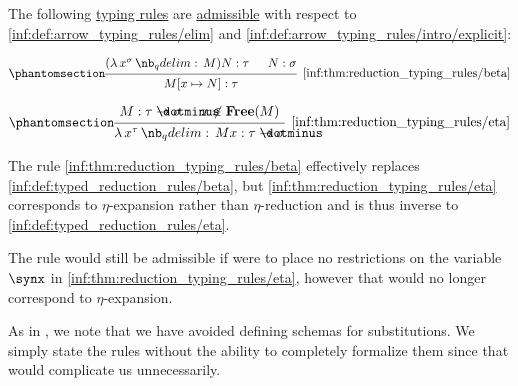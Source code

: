 \begin{proposition}\label{thm:reduction_typing_rules}
  The following \hyperref[con:typing_rule]{typing rules} are \hyperref[con:inference_rule_admissibility]{admissible} with respect to \ref{inf:def:arrow_typing_rules/elim} and \ref{inf:def:arrow_typing_rules/intro/explicit}:
  \begin{paracol}{2}
    \begin{leftcolumn}
      \ParacolAlignmentHack
      \begin{equation*}\taglabel[\ensuremath{ \rightarrow_\beta }]{inf:thm:reduction_typing_rules/beta}
        \begin{prooftree}
          \hypo{ (\qabs {x^{\sigma}} M) N: \tau }
          \hypo{ N: \sigma }
          \infer2[\ref{inf:thm:reduction_typing_rules/beta}]{ M[x \mapsto N]: \tau }.
        \end{prooftree}
      \end{equation*}
    \end{leftcolumn}

    \begin{rightcolumn}
      \ParacolAlignmentHack
      \begin{equation*}\taglabel[\ensuremath{ \leftarrow_\eta }]{inf:thm:reduction_typing_rules/eta}
        \begin{prooftree}
          \hypo{ M: \tau \synimplies \sigma }
          \hypo{ x \not\in \op*{Free}(M) }
          \infer2[\ref{inf:thm:reduction_typing_rules/eta}]{ \qabs {x^{\tau}} M x: \tau \synimplies \sigma }.
        \end{prooftree}
      \end{equation*}
    \end{rightcolumn}
  \end{paracol}
\end{proposition}
\begin{comments}
  \item The rule \ref{inf:thm:reduction_typing_rules/beta} effectively replaces \ref{inf:def:typed_reduction_rules/beta}, but \ref{inf:thm:reduction_typing_rules/eta} corresponds to \( \eta \)-expansion rather than \( \eta \)-reduction and is thus inverse to \ref{inf:def:typed_reduction_rules/eta}.

  The rule would still be admissible if were to place no restrictions on the variable \( \synx \) in \ref{inf:thm:reduction_typing_rules/eta}, however that would no longer correspond to \( \eta \)-expansion.

  \item As in , we note that we have avoided defining schemas for substitutions. We simply state the rules without the ability to completely formalize them since that would complicate us unnecessarily.
\end{comments}
